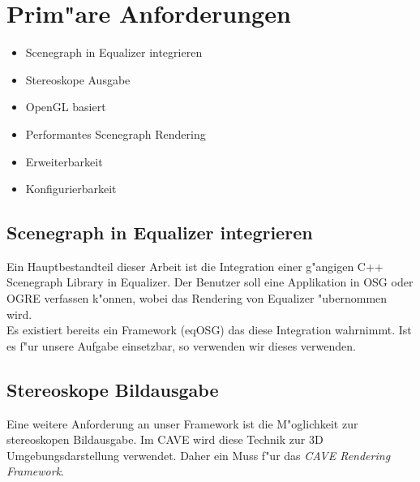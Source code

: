 \section{Prim"are Anforderungen}

\begin{itemize}
\item Scenegraph in Equalizer integrieren
\item Stereoskope Ausgabe
\item OpenGL basiert
\item Performantes Scenegraph Rendering
\item Erweiterbarkeit
\item Konfigurierbarkeit
\end{itemize}

\subsection{Scenegraph in Equalizer integrieren}
\label{sg_eq_int}
Ein Hauptbestandteil dieser Arbeit ist die Integration einer g"angigen C++ Scenegraph Library in Equalizer.  Der Benutzer soll eine Applikation in OSG oder OGRE verfassen k"onnen, wobei das Rendering von Equalizer "ubernommen wird.\\
Es existiert bereits ein Framework (eqOSG) das diese Integration wahrnimmt. Ist es f"ur unsere Aufgabe einsetzbar, so verwenden wir dieses verwenden.

\subsection{Stereoskope Bildausgabe}
Eine weitere Anforderung an unser Framework ist die M"oglichkeit zur stereoskopen Bildausgabe. Im CAVE wird diese Technik zur 3D Umgebungsdarstellung verwendet. Daher ein Muss f"ur das \textit{CAVE Rendering Framework}.


